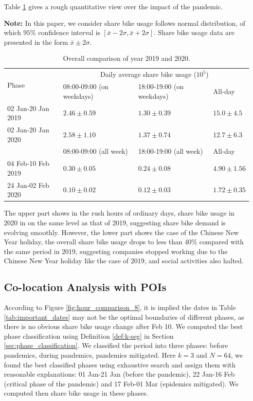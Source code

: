 \documentclass[ijgi,submit,moreauthors,pdftex]{Definitions/mdpi}
\begin{document}
Table \ref{tab:overall_comparison} gives a rough quantitative view over the impact of the pandemic.

\textbf{Note:} In this paper, we consider share bike usage follows normal distribution, of which $95\%$ confidence interval is $[\bar{x}-2\sigma,\bar{x}+2\sigma]$.
Share bike usage data are presented in the form $\bar{x}\pm2\sigma$.

\begin{table}[ht]
    \centering
    \begin{tabular}{|l|l|l|l|}
        \hline
        \multirow{2}{*}{Phase} &\multicolumn{3}{c|}{Daily average share bike usage ($10^{5}$)}\\
        \cline{2-4}
        & 08:00-09:00 (on weekdays) & 18:00-19:00 (on weekdays) & All-day\\
        \hline
        02 Jan-20 Jan 2019 & $2.46\pm0.59$ & $1.30\pm0.39$ & $15.0\pm4.5$\\
        \hline
        02 Jan-20 Jan 2020 & $2.58\pm1.10$ & $1.37\pm0.74$ & $12.7\pm6.3$\\
        \hline
        \hline
        & 08:00-09:00 (all week)  & 18:00-19:00 (all week) & All-day\\
        \hline
        04 Feb-10 Feb 2019 & $0.30\pm0.05$ & $0.24\pm0.08$ & $4.90\pm1.56$\\
        \hline
        24 Jan-02 Feb 2020 & $0.10\pm0.02$ & $0.12\pm0.03$ & $1.72\pm0.35$\\
        \hline
    \end{tabular}
    \caption{Overall comparison of year 2019 and 2020.}
    \label{tab:overall_comparison}
\end{table}

The upper part shows in the rush hours of ordinary days, share bike usage in 2020 in on the same level as that of 2019, suggesting share bike demand is evolving smoothly.
However, the lower part shows the case of the Chinese New Year holiday, the overall share bike usage drops to less than 40\% compared with the same period in 2019, suggesting companies stopped working due to the Chinese New Year holiday like the case of 2019, and social activities also halted. 

\subsection{Co-location Analysis with POIs}\label{sec:colo-poi}

According to Figure \ref{fig:hour_comparison_8}, it is implied the dates in Table \ref{tab:important_dates} may not be the optimal boundaries of different phases, as there is no obvious share bike usage change after Feb 10.
We computed the best phase classification using Definition \ref{def:k-seg} in Section \ref{sec:phase_classification}.
We classified the period into three phases: before pandemics, during pandemics, pandemics mitigated.
Here $k=3$ and $N=64$, we found the best classified phases using exhaustive search and assign them with reasonable explanations: 01 Jan-21 Jan (before the pandemic), 22 Jan-16 Feb (critical phase of the pandemic) and 17 Feb-01 Mar (epidemics mitigated).
We computed then share bike usage in these phases.
\end{document}
